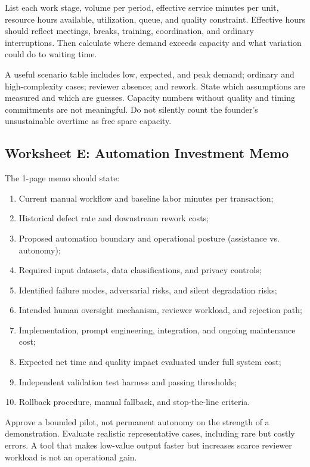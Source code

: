 List each work stage, volume per period, effective service minutes per unit, resource hours available, utilization, queue, and quality constraint. Effective hours should reflect meetings, breaks, training, coordination, and ordinary interruptions. Then calculate where demand exceeds capacity and what variation could do to waiting time.

A useful scenario table includes low, expected, and peak demand; ordinary and high-complexity cases; reviewer absence; and rework. State which assumptions are measured and which are guesses. Capacity numbers without quality and timing commitments are not meaningful. Do not silently count the founder's unsustainable overtime as free spare capacity.

\subsection{Worksheet E: Automation Investment Memo}
\label{sec:worksheet_e_automation_memo}

The 1-page memo should state:
\begin{enumerate}
    \item Current manual workflow and baseline labor minutes per transaction;
    \item Historical defect rate and downstream rework costs;
    \item Proposed automation boundary and operational posture (assistance vs. autonomy);
    \item Required input datasets, data classifications, and privacy controls;
    \item Identified failure modes, adversarial risks, and silent degradation risks;
    \item Intended human oversight mechanism, reviewer workload, and rejection path;
    \item Implementation, prompt engineering, integration, and ongoing maintenance cost;
    \item Expected net time and quality impact evaluated under full system cost;
    \item Independent validation test harness and passing thresholds;
    \item Rollback procedure, manual fallback, and stop-the-line criteria.
\end{enumerate}

Approve a bounded pilot, not permanent autonomy on the strength of a demonstration. Evaluate realistic representative cases, including rare but costly errors. A tool that makes low-value output faster but increases scarce reviewer workload is not an operational gain.

